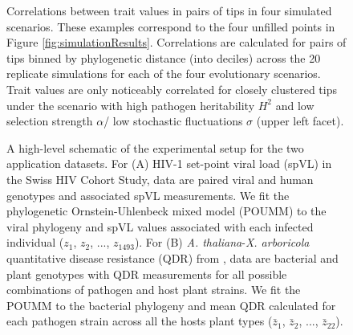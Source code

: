 \documentclass[11pt]{article}
\begin{document}
\begin{figure}[H]
\begin{center}
	\caption{Correlations between trait values in pairs of tips in four simulated scenarios. These examples correspond to the four unfilled points in Figure \ref{fig:simulationResults}. Correlations are calculated for pairs of tips binned by phylogenetic distance (into deciles) across the 20 replicate simulations for each of the four evolutionary scenarios. Trait values are only noticeably correlated for closely clustered tips under the scenario with high pathogen heritability $H^2$ and low selection strength $\alpha$/ low stochastic fluctuations $\sigma$ (upper left facet).}
	\label{fig:tip-trait-correlation}
	\end{center}
\end{figure}

\begin{figure}[H]
\begin{center}
	\caption{A high-level schematic of the experimental setup for the two application datasets. For (A) HIV-1 set-point viral load (spVL) in the Swiss HIV Cohort Study, data are paired viral and human genotypes and associated spVL measurements. We fit the phylogenetic Ornstein-Uhlenbeck mixed model (POUMM) to the viral phylogeny and spVL values associated with each infected individual ($z_1$, $z_2$, ..., $z_{1493}$). For (B) \emph{A. thaliana}-\emph{X. arboricola} quantitative disease resistance (QDR) from \cite{Wang2018Two-wayGenomes}, data are bacterial and plant genotypes with QDR measurements for all possible combinations of pathogen and host plant strains. We fit the POUMM to the bacterial phylogeny and mean QDR calculated for each pathogen strain across all the hosts plant types ($\bar{z}_1$, $\bar{z}_2$, ..., $\bar{z}_{22}$).}
	\label{fig:application-exp-setup}
	\end{center}
\end{figure}
\end{document}
